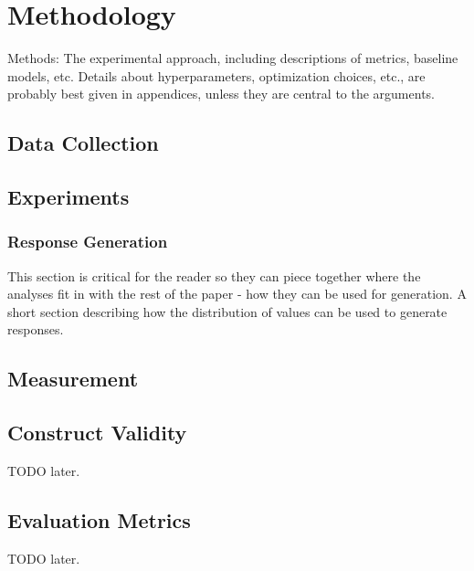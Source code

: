 
\section{Methodology}\label{sec:Methodology}
\textcolor{black!30}{Methods: The experimental approach, including descriptions of metrics, baseline models, etc. Details about hyperparameters, optimization choices, etc., are probably best given in appendices, unless they are central to the arguments.}

\subsection{Data Collection}
\textcolor{black!30}{\lipsum[30-33]}

\subsection{Experiments}
\textcolor{black!30}{\lipsum[12-14]}

\subsubsection{Response Generation}
\textcolor{black!40}{This section is critical for the reader so they can piece together where the analyses fit in with the rest of the paper - how they can be used for generation. A short section describing how the distribution of values can be used to generate responses.}

\subsection{Measurement}
\textcolor{black!30}{\lipsum[14-15]}

\subsection{Construct Validity}
TODO later.

\subsection{Evaluation Metrics}
TODO later.




